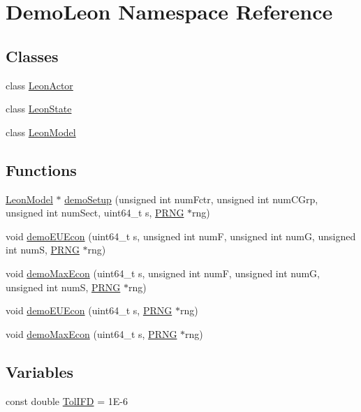 \hypertarget{namespace_demo_leon}{\section{Demo\-Leon Namespace Reference}
\label{namespace_demo_leon}
}
\subsection*{Classes}
\begin{DoxyCompactItemize}
\item 
class \hyperlink{class_demo_leon_1_1_leon_actor}{Leon\-Actor}
\item 
class \hyperlink{class_demo_leon_1_1_leon_state}{Leon\-State}
\item 
class \hyperlink{class_demo_leon_1_1_leon_model}{Leon\-Model}
\end{DoxyCompactItemize}
\subsection*{Functions}
\begin{DoxyCompactItemize}
\item 
\hyperlink{class_demo_leon_1_1_leon_model}{Leon\-Model} $\ast$ \hyperlink{namespace_demo_leon_a1952a634f15821bd5e9c3494478e5f11}{demo\-Setup} (unsigned int num\-Fctr, unsigned int num\-C\-Grp, unsigned int num\-Sect, uint64\-\_\-t s, \hyperlink{class_k_base_1_1_p_r_n_g}{P\-R\-N\-G} $\ast$rng)
\item 
void \hyperlink{namespace_demo_leon_a3f932095e9c8d4047724d6d5720771b3}{demo\-E\-U\-Econ} (uint64\-\_\-t s, unsigned int num\-F, unsigned int num\-G, unsigned int num\-S, \hyperlink{class_k_base_1_1_p_r_n_g}{P\-R\-N\-G} $\ast$rng)
\item 
void \hyperlink{namespace_demo_leon_a6002f793125cb27cec0c2b00c6789f64}{demo\-Max\-Econ} (uint64\-\_\-t s, unsigned int num\-F, unsigned int num\-G, unsigned int num\-S, \hyperlink{class_k_base_1_1_p_r_n_g}{P\-R\-N\-G} $\ast$rng)
\item 
void \hyperlink{namespace_demo_leon_a4f555ce9995c3513b27363f20df7726f}{demo\-E\-U\-Econ} (uint64\-\_\-t s, \hyperlink{class_k_base_1_1_p_r_n_g}{P\-R\-N\-G} $\ast$rng)
\item 
void \hyperlink{namespace_demo_leon_a996cc31e7fe70c98304bbed0a5e82b38}{demo\-Max\-Econ} (uint64\-\_\-t s, \hyperlink{class_k_base_1_1_p_r_n_g}{P\-R\-N\-G} $\ast$rng)
\end{DoxyCompactItemize}
\subsection*{Variables}
\begin{DoxyCompactItemize}
\item 
const double \hyperlink{namespace_demo_leon_aee0da94625955ef3c07d35ccd4426ee3}{Tol\-I\-F\-D} = 1\-E-\/6
\end{DoxyCompactItemize}


